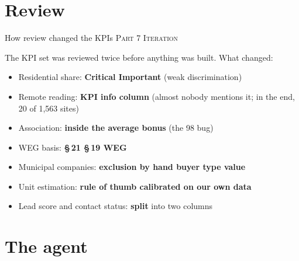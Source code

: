 \documentclass[aspectratio=169,11pt]{beamer}
\newcommand{\partlabel}[1]{{\small\color{assume}\textsc{#1}}\par\vspace{0.3em}}
\begin{document}
\section{Review}

\begin{frame}{How review changed the KPIs}
  \partlabel{Part 7 \textbullet{} Iteration}
  The KPI set was reviewed twice before anything was built. What changed:
  \begin{itemize}
    \item Residential share: \textbf{Critical \textrightarrow{} Important} (weak discrimination)
    \item Remote reading: \textbf{KPI \textrightarrow{} info column} (almost nobody mentions it;
          in the end, 20 of 1,563 sites)
    \item Association: \textbf{inside the average \textrightarrow{} bonus} (the 98 bug)
    \item WEG basis: \textbf{\S\,21 \textrightarrow{} \S\,19 WEG}
    \item Municipal companies: \textbf{exclusion by hand \textrightarrow{} buyer type value}
    \item Unit estimation: \textbf{rule of thumb \textrightarrow{} calibrated on our own data}
    \item Lead score and contact status: \textbf{split} into two columns
  \end{itemize}
\end{frame}

\section{The agent}
\end{document}

